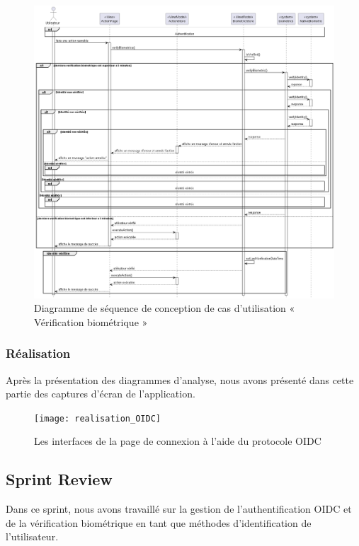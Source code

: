 \begin{figure}[H]
  \centering
  \includegraphics[width=1\textwidth]{out/diagrams/sprint5/sequence_verification_biometrique/sequence_verification_biometrique}
  \caption{Diagramme de séquence de conception de cas d'utilisation « Vérification biométrique »}
  \label{fig:sequence_conception_verification_biometrique}
\end{figure}

\subsubsection{Réalisation}

Après la présentation des diagrammes d'analyse, nous avons présenté dans cette partie des captures d'écran de l'application.

\begin{figure}[H]
  \centering
  \texttt{[image: realisation\_OIDC]}
  \caption{Les interfaces de la page de connexion à l’aide du protocole OIDC}
  \label{fig:realisation_OIDC}
\end{figure}

\subsection{Sprint Review}
Dans ce sprint, nous avons travaillé sur la gestion de l'authentification OIDC et de la vérification biométrique en tant que méthodes d'identification de l'utilisateur.
